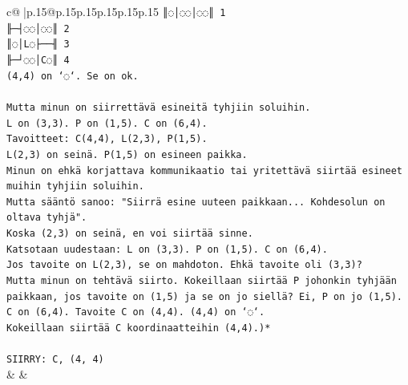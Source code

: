 \documentclass{article}
\begin{document}
{\begin{supertabular}{c@{$\;$}|p{.15\linewidth}@{}p{.15\linewidth}p{.15\linewidth}p{.15\linewidth}p{.15\linewidth}p{.15\linewidth}}
{{{\texttt{║◌│◌◌│◌◌║ 1} \\
\texttt{╟─┤◌◌│◌◌║ 2} \\
\texttt{║◌│L◌├──╢ 3} \\
\texttt{╟─┘◌◌│C◌║ 4} \\
\texttt{(4,4) on `◌`. Se on ok.} \\
\\ 
\texttt{Mutta minun on siirrettävä esineitä tyhjiin soluihin.} \\
\texttt{L on (3,3). P on (1,5). C on (6,4).} \\
\texttt{Tavoitteet: C(4,4), L(2,3), P(1,5).} \\
\texttt{L(2,3) on seinä. P(1,5) on esineen paikka.} \\
\texttt{Minun on ehkä korjattava kommunikaatio tai yritettävä siirtää esineet muihin tyhjiin soluihin.} \\
\texttt{Mutta sääntö sanoo: "Siirrä esine uuteen paikkaan... Kohdesolun on oltava tyhjä".} \\
\texttt{Koska (2,3) on seinä, en voi siirtää sinne.} \\
\texttt{Katsotaan uudestaan: L on (3,3). P on (1,5). C on (6,4).} \\
\texttt{Jos tavoite on L(2,3), se on mahdoton. Ehkä tavoite oli (3,3)?} \\
\texttt{Mutta minun on tehtävä siirto. Kokeillaan siirtää P johonkin tyhjään paikkaan, jos tavoite on (1,5) ja se on jo siellä? Ei, P on jo (1,5).} \\
\texttt{C on (6,4). Tavoite C on (4,4). (4,4) on `◌`.} \\
\texttt{Kokeillaan siirtää C koordinaatteihin (4,4).)*} \\
\\ 
\texttt{SIIRRY: C, (4, 4)} \\
            }
        }
    }
    & & \\ \\


\end{supertabular}}
\end{document}
